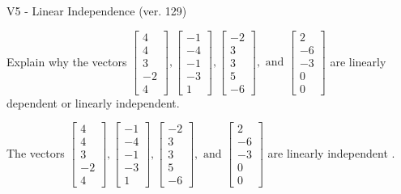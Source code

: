 \begin{exercise}
  \begin{exerciseTitle}V5 - Linear Independence (ver. 129)\end{exerciseTitle}
  \begin{exerciseStatement}
    Explain why the vectors \(\left[\begin{array}{r}
4 \\
4 \\
3 \\
-2 \\
4
\end{array}\right] , \left[\begin{array}{r}
-1 \\
-4 \\
-1 \\
-3 \\
1
\end{array}\right] , \left[\begin{array}{r}
-2 \\
3 \\
3 \\
5 \\
-6
\end{array}\right] , \text{ and } \left[\begin{array}{r}
2 \\
-6 \\
-3 \\
0 \\
0
\end{array}\right]\) are linearly dependent or linearly independent.	


  \end{exerciseStatement}
  \begin{exerciseAnswer}
   The vectors \(\left[\begin{array}{r}
4 \\
4 \\
3 \\
-2 \\
4
\end{array}\right] , \left[\begin{array}{r}
-1 \\
-4 \\
-1 \\
-3 \\
1
\end{array}\right] , \left[\begin{array}{r}
-2 \\
3 \\
3 \\
5 \\
-6
\end{array}\right] , \text{ and } \left[\begin{array}{r}
2 \\
-6 \\
-3 \\
0 \\
0
\end{array}\right]\) are 
  	 linearly independent  .
  


  \end{exerciseAnswer}
\end{exercise}